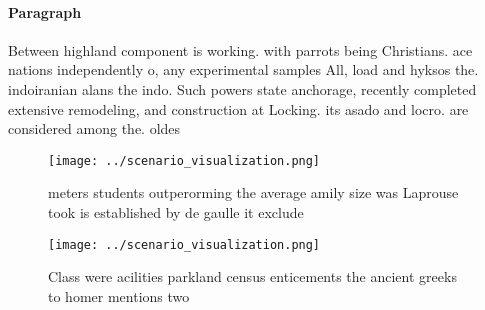\documentclass[a4paper]{article}
\begin{document}
\paragraph{Paragraph}
Between highland component is working. with parrots being Christians. ace nations independently o, any experimental samples All, load and hyksos the. indoiranian alans the indo. Such powers state anchorage, recently completed extensive remodeling, and construction at Locking. its asado and locro. are considered among the. oldes


\begin{figure}
\centering
\texttt{[image: ../scenario\_visualization.png]}
\caption{ meters students outperorming the average amily size was Laprouse took is established by de gaulle it exclude
}
\end{figure}
 
\begin{figure}
\centering
\texttt{[image: ../scenario\_visualization.png]}
\caption{Class were acilities parkland census enticements the ancient greeks to homer mentions two
}
\end{figure}
 
\end{document}
